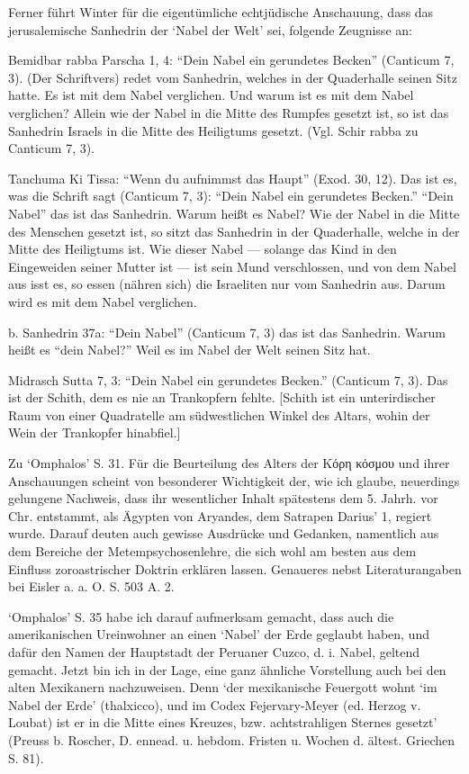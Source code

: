 \documentclass[a4paper, 11pt, oneside]{article}
\begin{document}
Ferner führt Winter für die eigentümliche echtjüdische Anschauung, dass das jerusalemische Sanhedrin der `Nabel der Welt' sei, folgende Zeugnisse an:

Bemidbar rabba Parscha 1, 4: "`Dein Nabel ein gerundetes Becken"' (Canticum 7, 3). (Der Schriftvers) redet vom Sanhedrin, welches in der Quaderhalle seinen Sitz hatte. Es ist mit dem Nabel verglichen. Und warum ist es mit dem Nabel verglichen? Allein wie der Nabel in die Mitte des Rumpfes gesetzt ist, so ist das Sanhedrin Israels in die Mitte des Heiligtums gesetzt. (Vgl. Schir rabba zu Canticum 7, 3).

Tanchuma Ki Tissa: "`Wenn du aufnimmst das Haupt"' (Exod. 30, 12). Das ist es, was die Schrift sagt (Canticum 7, 3): "`Dein Nabel ein gerundetes Becken."' "`Dein Nabel"' das ist das Sanhedrin. Warum heißt es Nabel? Wie der Nabel in die Mitte des Menschen gesetzt ist, so sitzt das Sanhedrin in der Quaderhalle, welche in der Mitte des Heiligtums ist. Wie dieser Nabel --- solange das Kind in den Eingeweiden seiner Mutter ist --- ist sein Mund verschlossen, und von dem Nabel aus isst es, so essen (nähren sich) die Israeliten nur vom Sanhedrin aus. Darum wird es mit dem Nabel verglichen.

b. Sanhedrin 37a: "`Dein Nabel"' (Canticum 7, 3) das ist das Sanhedrin. Warum heißt es "`dein Nabel?"' Weil es im Nabel der Welt seinen Sitz hat.

Midrasch Sutta 7, 3: "`Dein Nabel ein gerundetes Becken."' (Canticum 7, 3). Das ist der Schith, dem es nie an Trankopfern fehlte. [Schith ist ein unterirdischer Raum von einer Quadratelle am südwestlichen Winkel des Altars, wohin der Wein der Trankopfer hinabfiel.]

Zu `Omphalos' S. 31. Für die Beurteilung des Alters der Κόρη κόσμου und ihrer Anschauungen scheint von besonderer Wichtigkeit der, wie ich glaube, neuerdings gelungene Nachweis, dass ihr wesentlicher Inhalt spätestens dem 5. Jahrh. vor Chr. entstammt, als Ägypten von Aryandes, dem Satrapen Darius' 1, regiert wurde. Darauf deuten auch gewisse Ausdrücke und Gedanken, namentlich aus dem Bereiche der Metempsychosenlehre, die sich wohl am besten aus dem Einfluss zoroastrischer Doktrin erklären lassen. Genaueres nebst Literaturangaben bei Eisler a. a. O. S. 503 A. 2.

`Omphalos' S. 35 habe ich darauf aufmerksam gemacht, dass auch die amerikanischen Ureinwohner an einen `Nabel' der Erde geglaubt haben, und dafür den Namen der Hauptstadt der Peruaner Cuzco, d. i. Nabel, geltend gemacht. Jetzt bin ich in der Lage, eine ganz ähnliche Vorstellung auch bei den alten Mexikanern nachzuweisen. Denn `der mexikanische Feuergott wohnt `im Nabel der Erde' (thalxicco), und im Codex Fejervary-Meyer (ed. Herzog v. Loubat) ist er in die Mitte eines Kreuzes, bzw. achtstrahligen Sternes gesetzt' (Preuss b. Roscher, D. ennead. u. hebdom. Fristen u. Wochen d. ältest. Griechen S. 81).
\end{document}
